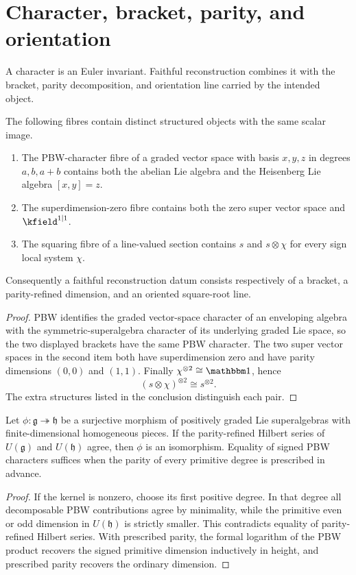 \chapter{Character, bracket, parity, and orientation}
A character is an Euler invariant.  Faithful reconstruction combines it with the bracket, parity decomposition, and orientation line carried by the intended object.

\begin{theorem}
The following fibres contain distinct structured objects with the same scalar image.
\begin{enumerate}
\item The PBW-character fibre of a graded vector space with basis $x,y,z$ in degrees $a,b,a+b$ contains both the abelian Lie algebra and the Heisenberg Lie algebra $[x,y]=z$.
\item The superdimension-zero fibre contains both the zero super vector space and $\kfield^{1|1}$.
\item The squaring fibre of a line-valued section contains $s$ and $s\otimes\chi$ for every sign local system $\chi$.
\end{enumerate}
Consequently a faithful reconstruction datum consists respectively of a bracket, a parity-refined dimension, and an oriented square-root line.
\end{theorem}
\begin{proof}
PBW identifies the graded vector-space character of an enveloping algebra with the symmetric-superalgebra character of its underlying graded Lie space, so the two displayed brackets have the same PBW character.  The two super vector spaces in the second item both have superdimension zero and have parity dimensions $(0,0)$ and $(1,1)$.  Finally $\chi^{\otimes2}\cong\mathbbm1$, hence
\[
 (s\otimes\chi)^{\otimes2}\cong s^{\otimes2}.
\]
The extra structures listed in the conclusion distinguish each pair.
\end{proof}

\begin{recognition}
Let $\phi:\mathfrak g\twoheadrightarrow\mathfrak h$ be a surjective morphism of positively graded Lie superalgebras with finite-dimensional homogeneous pieces.  If the parity-refined Hilbert series of $U(\mathfrak g)$ and $U(\mathfrak h)$ agree, then $\phi$ is an isomorphism.  Equality of signed PBW characters suffices when the parity of every primitive degree is prescribed in advance.
\end{recognition}
\begin{proof}
If the kernel is nonzero, choose its first positive degree.  In that degree all decomposable PBW contributions agree by minimality, while the primitive even or odd dimension in $U(\mathfrak h)$ is strictly smaller.  This contradicts equality of parity-refined Hilbert series.  With prescribed parity, the formal logarithm of the PBW product recovers the signed primitive dimension inductively in height, and prescribed parity recovers the ordinary dimension.
\end{proof}


